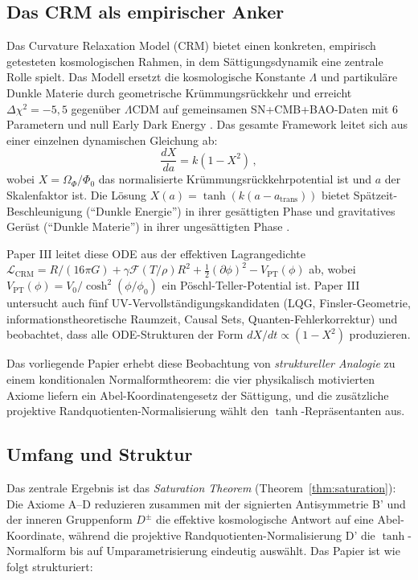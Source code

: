 \documentclass[aps,prd,twocolumn,superscriptaddress,nofootinbib]{revtex4-2}
\begin{document}
\subsection{Das CRM als empirischer Anker}

Das Curvature Relaxation Model (CRM) \cite{Geiger2026,Geiger2026b,Geiger2026c,Geiger2026d} bietet einen konkreten, empirisch getesteten kosmologischen Rahmen, in dem Sättigungsdynamik eine zentrale Rolle spielt. Das Modell ersetzt die kosmologische Konstante $\Lambda$ und partikuläre Dunkle Materie durch geometrische Krümmungsrückkehr und erreicht $\Delta\chi^2 = -5,5$ gegenüber $\Lambda$CDM auf gemeinsamen SN+CMB+BAO-Daten mit 6 Parametern und null Early Dark Energy \cite{Geiger2026b}. Das gesamte Framework leitet sich aus einer einzelnen dynamischen Gleichung ab:
\begin{equation}
\frac{dX}{da} = k(1 - X^2)\,,
\label{eq:saturation_ode}
\end{equation}
wobei $X = \Omega_\Phi/\Phi_0$ das normalisierte Krümmungsrückkehrpotential ist und $a$ der Skalenfaktor ist. Die Lösung $X(a) = \tanh(k(a - a_{\mathrm{trans}}))$ bietet Spätzeit-Beschleunigung (``Dunkle Energie'') in ihrer gesättigten Phase und gravitatives Gerüst (``Dunkle Materie'') in ihrer ungesättigten Phase \cite{Geiger2026b}.

Paper III \cite{Geiger2026c} leitet diese ODE aus der effektiven Lagrangedichte $\mathcal{L}_{\mathrm{CRM}} = R/(16\pi G) + \gamma \mathcal{F}(T/\rho) R^2 + \frac{1}{2}(\partial\phi)^2 - V_{\mathrm{PT}}(\phi)$ ab, wobei $V_{\mathrm{PT}}(\phi) = V_0/\cosh^2(\phi/\phi_0)$ ein Pöschl-Teller-Potential ist. Paper III untersucht auch fünf UV-Vervollständigungskandidaten (LQG, Finsler-Geometrie, informationstheoretische Raumzeit, Causal Sets, Quanten-Fehlerkorrektur) und beobachtet, dass alle ODE-Strukturen der Form $dX/dt \propto (1 - X^2)$ produzieren.

Das vorliegende Papier erhebt diese Beobachtung von \textit{struktureller Analogie} zu einem konditionalen Normalformtheorem: die vier physikalisch motivierten Axiome liefern ein Abel-Koordinatengesetz der Sättigung, und die zusätzliche projektive Randquotienten-Normalisierung wählt den $\tanh$-Repräsentanten aus.

\subsection{Umfang und Struktur}

Das zentrale Ergebnis ist das \textit{Saturation Theorem} (Theorem~\ref{thm:saturation}): Die Axiome A--D reduzieren zusammen mit der signierten Antisymmetrie B' und der inneren Gruppenform $D^\pm$ die effektive kosmologische Antwort auf eine Abel-Koordinate, während die projektive Randquotienten-Normalisierung D' die $\tanh$-Normalform bis auf Umparametrisierung eindeutig auswählt. Das Papier ist wie folgt strukturiert:
\end{document}
